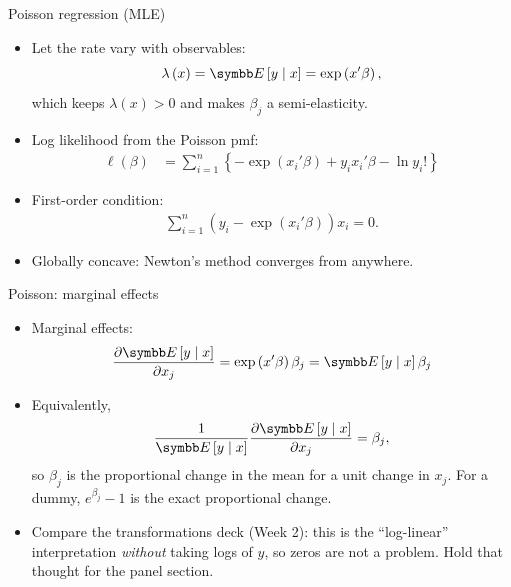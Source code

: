 \documentclass[aspectratio=169,11pt]{beamer}
\begin{document}
\begin{frame}{Poisson regression (MLE)}
\begin{itemize}
\item  Let the rate vary with observables:\[
	\lambda \left(x\right) = \E\left[y \mid x\right] = \exp\left(x'\beta\right),
	\]
	which keeps $\lambda(x) > 0$ and makes $\beta_j$ a semi-elasticity.
	\medskip
	\item Log likelihood from the Poisson pmf:\begin{align*}
	\ell\left(\beta\right) &=  \sum_{i=1}^{n}\left\{-\exp\left(x_{i}'\beta \right)+ y_i x_{i}' \beta - \ln y_{i}!\right\}
	\end{align*}
	\item First-order condition:\begin{align*}
	  \sum_{i=1}^{n}\left(y_i -\exp\left(x_{i}'\beta \right) \right) x_{i} = 0 .
	\end{align*}
	\item Globally concave: Newton's method converges from anywhere.
\end{itemize}
\end{frame}


\begin{frame}{Poisson: marginal effects}
\begin{itemize}
\item Marginal effects:\[
	\frac{\partial \E\left[y \mid x\right]}{\partial x_j} = \exp\left( x'\beta\right) \beta_j =
	\E\left[y \mid x\right] \beta_j
\]
	\item Equivalently,\[
	\frac{1}{\E\left[y \mid x\right] }\frac{\partial \E\left[y \mid x\right]}{\partial x_j}  = \beta_j,
\]
	so $\beta_j$ is the \alert{proportional change in the mean} for a unit change in $x_j$. For a dummy,
	$e^{\beta_j} - 1$ is the exact proportional change.
	\medskip
	\item Compare the transformations deck (Week 2): this is the ``log-linear'' interpretation
	\emph{without} taking logs of $y$, so zeros are not a problem. Hold that thought for the panel section.
\end{itemize}
\end{frame}
\end{document}
